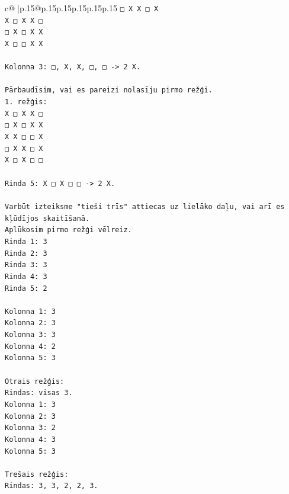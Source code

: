\documentclass{article}
\begin{document}
{\begin{supertabular}{c@{$\;$}|p{.15\linewidth}@{}p{.15\linewidth}p{.15\linewidth}p{.15\linewidth}p{.15\linewidth}p{.15\linewidth}}
{{{\texttt{□ X X □ X} \\
\texttt{X □ X X □} \\
\texttt{□ X □ X X} \\
\texttt{X □ □ X X} \\
\\ 
\texttt{Kolonna 3: □, X, X, □, □ {-}> 2 X.} \\
\\ 
\texttt{Pārbaudīsim, vai es pareizi nolasīju pirmo režģi.} \\
\texttt{1. režģis:} \\
\texttt{X □ X X □} \\
\texttt{□ X □ X X} \\
\texttt{X X □ □ X} \\
\texttt{□ X X □ X} \\
\texttt{X □ X □ □} \\
\\ 
\texttt{Rinda 5: X □ X □ □ {-}> 2 X.} \\
\\ 
\texttt{Varbūt izteiksme "tieši trīs" attiecas uz lielāko daļu, vai arī es kļūdījos skaitīšanā.} \\
\texttt{Aplūkosim pirmo režģi vēlreiz.} \\
\texttt{Rinda 1: 3} \\
\texttt{Rinda 2: 3} \\
\texttt{Rinda 3: 3} \\
\texttt{Rinda 4: 3} \\
\texttt{Rinda 5: 2} \\
\\ 
\texttt{Kolonna 1: 3} \\
\texttt{Kolonna 2: 3} \\
\texttt{Kolonna 3: 3} \\
\texttt{Kolonna 4: 2} \\
\texttt{Kolonna 5: 3} \\
\\ 
\texttt{Otrais režģis:} \\
\texttt{Rindas: visas 3.} \\
\texttt{Kolonna 1: 3} \\
\texttt{Kolonna 2: 3} \\
\texttt{Kolonna 3: 2} \\
\texttt{Kolonna 4: 3} \\
\texttt{Kolonna 5: 3} \\
\\ 
\texttt{Trešais režģis:} \\
\texttt{Rindas: 3, 3, 2, 2, 3.} \\
}}}
\end{supertabular}}
\end{document}
